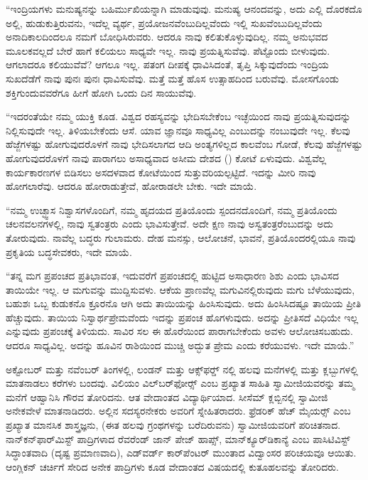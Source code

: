 \vskip 1pt

 “ಇಂದ್ರಿಯಗಳು ಮನುಷ್ಯನನ್ನು ಬಹಿರ್ಮುಖಿಯನ್ನಾಗಿ ಮಾಡುವುವು. ಮನುಷ್ಯ ಆನಂದವನ್ನು, ಅದು ಎಲ್ಲಿ ದೊರಕದೊ ಅಲ್ಲಿ, ಹುಡುಕುತ್ತಿರುವನು, ಇದೆಲ್ಲ ವ್ಯರ್ಥ, ಪ್ರಯೋಜನವೆಂಬುದಿಲ್ಲವೆಂದು ಇಲ್ಲಿ ಸುಖವೆಂಬುದಿಲ್ಲವೆಂದು ಅನಾದಿಕಾಲದಿಂದಲೂ ನಮಗೆ ಬೋಧಿಸಿರುವರು. ಆದರೂ ನಾವು ಕಲಿತುಕೊಳ್ಳುವುದಿಲ್ಲ. ನಮ್ಮ ಅನುಭವದ ಮೂಲಕವಲ್ಲದೆ ಬೇರೆ ಹಾಗೆ ಕಲಿಯಲು ಸಾಧ್ಯವೇ ಇಲ್ಲ. ನಾವು ಪ್ರಯತ್ನಿಸುವೆವು. ಪೆಟ್ಟೊಂದು ಬೀಳುವುದು. ಆಗಲಾದರೂ ಕಲಿಯುವೆವೆ? ಆಗಲೂ ಇಲ್ಲ. ಪತಂಗ ದೀಪಕ್ಕೆ ಧಾವಿಸಿದಂತೆ, ತೃಪ್ತಿ ಸಿಕ್ಕುವುದೆಂದು ಇಂದ್ರಿಯ ಸುಖದೆಡೆಗೆ ನಾವು ಪುನಃ ಪುನಃ ಧಾವಿಸುವೆವು. ಮತ್ತೆ ಮತ್ತೆ ಹೊಸ ಉತ್ಸಾಹದಿಂದ ಬರುವೆವು. ಮೋಸಗೊಂಡು ಶಕ್ತಿಗುಂದುವವರೆಗೂ ಹೀಗೆ ಹೋಗಿ ಒಂದು ದಿನ ಸಾಯುವೆವು.

\vskip 1pt

 “ಇದರಂತೆಯೇ ನಮ್ಮ ಯುಕ್ತಿ ಕೂಡ. ವಿಶ್ವದ ರಹಸ್ಯವನ್ನು ಭೇದಿಸಬೇಕೆಂಬ ಇಚ್ಛೆಯಿಂದ ನಾವು ಪ್ರಯತ್ನಿಸುವುದನ್ನು ನಿಲ್ಲಿಸುವುದೇ ಇಲ್ಲ. ತಿಳಿಯಬೇಕೆಂದು ಆಸೆ. ಯಾವ ಜ್ಞಾನವೂ ಸಾಧ್ಯವಿಲ್ಲ ಎಂಬುದನ್ನು ನಂಬುವುದೇ ಇಲ್ಲ. ಕೆಲವು ಹೆಜ್ಜೆಗಳಷ್ಟು ಹೋಗುವುದರೊಳಗೆ ನಾವು ಭೇದಿಸಲಾಗದ ಆದಿ ಅಂತ್ಯಗಳಿಲ್ಲದ ಕಾಲವೆಂಬ ಗೋಡೆ, ಕೆಲವು ಹೆಜ್ಜೆಗಳಷ್ಟು ಹೋಗುವುದರೊಳಗೆ ನಾವು ಪಾರಾಗಲು ಅಸಾಧ್ಯವಾದ ಅಸೀಮ ದೇಶದ () ಕೋಟೆ ಏಳುವುದು. ವಿಶ್ವವೆಲ್ಲ ಕಾರ್ಯಕಾರಣಗಳ ಬಿಡಿಸಲು ಅಸದಳವಾದ ಕೋಟೆಯಿಂದ ಸುತ್ತುವರಿಯಲ್ಪಟ್ಟಿದೆ. ಇದನ್ನು ಮೀರಿ ನಾವು ಹೋಗಲಾರೆವು. ಆದರೂ ಹೋರಾಡುತ್ತೇವೆ, ಹೋರಾಡಲೇ ಬೇಕು. ಇದೇ ಮಾಯೆ.

\vskip 1pt

 “ನಮ್ಮ ಉಚ್ಛ್ವಾಸ ನಿಶ್ವಾಸಗಳೊಂದಿಗೆ, ನಮ್ಮ ಹೃದಯದ ಪ್ರತಿಯೊಂದು ಸ್ಪಂದನದೊಂದಿಗೆ, ನಮ್ಮ ಪ್ರತಿಯೊಂದು ಚಲನವಲನಗಳಲ್ಲಿ, ನಾವು ಸ್ವತಂತ್ರರು ಎಂದು ಭಾವಿಸುತ್ತೇವೆ. ಅದೇ ಕ್ಷಣ ನಾವು ಅಸ್ವತಂತ್ರರೆಂಬುದನ್ನು ಅದು ತೋರುವುದು. ನಾವೆಲ್ಲ ಬದ್ಧರು ಗುಲಾಮರು. ದೇಹ ಮನಸ್ಸು, ಆಲೋಚನೆ, ಭಾವನೆ, ಪ್ರತಿಯೊಂದರಲ್ಲಿಯೂ ನಾವು ಪ್ರಕೃತಿಯ ಬದ್ಧಸೇವಕರು, ಇದೇ ಮಾಯೆ.

\vskip 1pt

 “ತನ್ನ ಮಗ ಪ್ರಪಂಚದ ಪ್ರತಿಭಾವಂತ, ಇದುವರೆಗೆ ಪ್ರಪಂಚದಲ್ಲಿ ಹುಟ್ಟಿದ ಅಸಾಧಾರಣ ಶಿಶು ಎಂದು ಭಾವಿಸದ ತಾಯಿಯೇ ಇಲ್ಲ. ಆ ಮಗುವನ್ನು ಮುದ್ದಿಸುವಳು. ಆಕೆಯ ಪ್ರಾಣವೆಲ್ಲ ಮಗುವಿನಲ್ಲಿರುವುದು ಮಗು ಬೆಳೆಯುವುದು, ಬಹುಶಃ ಒಬ್ಬ ಕುಡುಕನೊ ಕ್ರೂರನೊ ಆಗಿ ಅದು ತಾಯಿಯನ್ನು ಹಿಂಸಿಸುವುದು. ಅದು ಹಿಂಸಿಸಿದಷ್ಟೂ ತಾಯಿಯ ಪ್ರೀತಿ ಹೆಚ್ಚುವುದು. ತಾಯಿಯ ನಿಸ್ವಾರ್ಥಪ್ರೇಮವೆಂದು ಇದನ್ನು ಪ್ರಪಂಚ ಹೊಗಳುವುದು. ಅದನ್ನು ಪ್ರೀತಿಸದೆ ವಿಧಿಯೇ ಇಲ್ಲ ಎನ್ನುವುದು ಪ್ರಪಂಚಕ್ಕೆ ತಿಳಿಯದು. ಸಾವಿರ ಸಲ ಈ ಹೊರೆಯಿಂದ ಪಾರಾಗಬೇಕೆಂದು ಅವಳು ಆಲೋಚಿಸಬಹುದು. ಆದರೂ ಸಾಧ್ಯವಿಲ್ಲ. ಅದನ್ನು ಹೂವಿನ ರಾಶಿಯಿಂದ ಮುಚ್ಚಿ ಅದ್ಭುತ ಪ್ರೇಮ ಎಂದು ಕರೆಯುವಳು. ಇದೇ ಮಾಯೆ.” 

 ಅಕ್ಟೋಬರ್ ಮತ್ತು ನವೆಂಬರ್ ತಿಂಗಳಲ್ಲಿ, ಲಂಡನ್ ಮತ್ತು ಆಕ್ಸ್‌ಫರ್ಡ್‍ ನಲ್ಲಿ ಹಲವು ಮನೆಗಳಲ್ಲಿ ಮತ್ತು ಕ್ಲಬ್ಬುಗಳಲ್ಲಿ ಮಾತನಾಡಲು ಕರೆಗಳು ಬಂದವು. ವಿಲಿಯಂ ವಿಲ್‌ಬರ್‌ಫೋರ್ಸ್‍ ಎಂಬ ಪ್ರಖ್ಯಾತ ಸಾಹಿತಿ ಸ್ವಾಮೀಜಿಯವರನ್ನು ತಮ್ಮ ಮನೆಗೆ ಆಹ್ವಾನಿಸಿ ಗೌರವ ತೋರಿದನು. ಆತ ವೇದಾಂತದ ವಿದ್ಯಾರ್ಥಿಯಾದ. ಸೀಸೆಮ್ ಕ್ಲಬ್ಬಿನಲ್ಲಿ ಸ್ವಾಮೀಜಿ ಅನೇಕವೇಳೆ ಮಾತನಾಡಿದರು. ಅಲ್ಲಿನ ಸದಸ್ಯರನೇಕರು ಅವರಿಗೆ ಸ್ನೇಹಿತರಾದರು. ಫ್ರೆಡರಿಕ್ ಹೆಚ್ ಮೈಯರ್ಸ್‍ ಎಂಬ ಪ್ರಖ್ಯಾತ ಮಾನಸಿಕ ಶಾಸ್ತ್ರಜ್ಞನು, (ಈತ ಹಲವು ಗ್ರಂಥಗಳನ್ನು ಬರೆದಿರುವನು) ಸ್ವಾಮೀಜಿಯವರಿಗೆ ಪರಿಚಿತನಾದ. ನಾನ್‌ಕನ್‌ಫಾರ್‌ಮಿಸ್ಟ್ ಪಾದ್ರಿಗಳಾದ ರೆವರೆಂಡ್ ಜಾನ್ ಪೇಜ್ ಹಾಪ್ಸ್, ಮಾನ್‌ಕ್ಯೂರ್‌ಡಿಕಾನ್ಯೆ ಎಂಬ ಪಾಸಿಟಿವಿಸ್ಟ್ ಸಿದ್ಧಾಂತವಾದಿ (ದೃಷ್ಟ ಪ್ರಮಾಣವಾದಿ), ಎಡ್‌ವರ್ಡ್ ಕಾರ್‌ಪೆಂಟರ್ ಮುಂತಾದ ವಿದ್ವಾಂಸರ ಪರಿಚಯವೂ ಆಯಿತು. ಆಂಗ್ಲಿಕನ್ ಚರ್ಚಿಗೆ ಸೇರಿದ ಅನೇಕ ಪಾದ್ರಿಗಳು ಕೂಡ ವೇದಾಂತದ ವಿಷಯದಲ್ಲಿ ಕುತೂಹಲವನ್ನು ತೋರಿದರು. 

